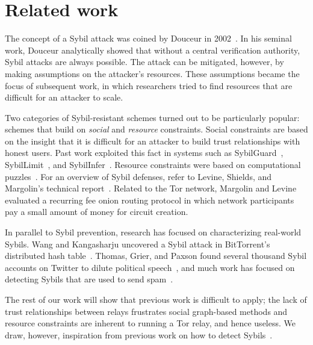 \section{Related work}
\label{sec:related_work}
The concept of a Sybil attack was coined by Douceur in 2002~\cite{Douceur2002a}.
In his seminal work, Douceur analytically showed that without a central
verification authority, Sybil attacks are always possible.  The attack can be
mitigated, however, by making assumptions on the attacker's resources.  These
assumptions became the focus of subsequent work, in which researchers tried to
find resources that are difficult for an attacker to scale.

Two categories of Sybil-resistant schemes turned out to be particularly popular:
schemes that build on \emph{social} and \emph{resource} constraints.  Social
constraints are based on the insight that it is difficult for an attacker to
build trust relationships with honest users.  Past work exploited this fact in
systems such as SybilGuard~\cite{Yu2006a}, SybilLimit~\cite{Yu2008a}, and
SybilInfer~\cite{Danezis2009a}.  Resource constraints were based on
computational puzzles~\cite{Borisov2006a,Li2012a}.  For an overview of Sybil
defenses, refer to Levine, Shields, and Margolin's technical
report~\cite{Levine2006a}.  Related to the Tor network, Margolin and
Levine~\cite{Margolin2008a} evaluated a recurring fee onion routing protocol in
which network participants pay a small amount of money for circuit creation.

In parallel to Sybil prevention, research has focused on characterizing
real-world Sybils.  Wang and Kangasharju uncovered a Sybil attack in
BitTorrent's distributed hash table~\cite{Wang2012a}.  Thomas, Grier, and Paxson
found several thousand Sybil accounts on Twitter to dilute political
speech~\cite{Thomas2012a}, and much work has focused on detecting Sybils that
are used to send spam~\cite{Gao2010a}.

The rest of our work will show that previous work is difficult to apply; the
lack of trust relationships between relays frustrates social graph-based
methods and resource constraints are inherent to running a Tor relay, and hence
useless.  We draw, however, inspiration from previous work on how to detect
Sybils~\cite{Liu2015a}.
